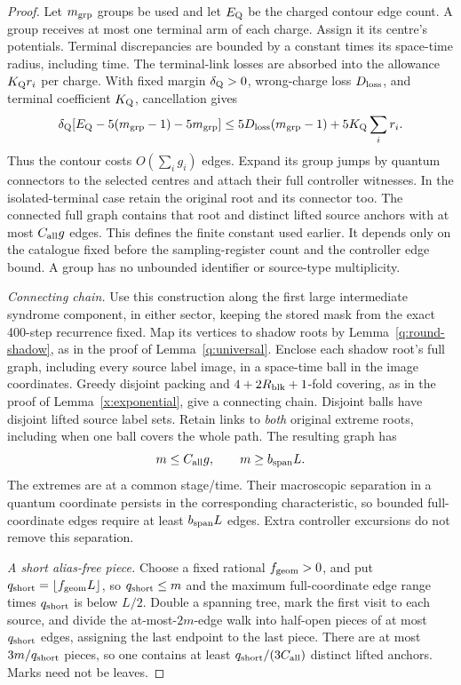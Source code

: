 \begin{proof}
Let \(m_{\rm grp}\) groups be used and let \(E_{\rm Q}\) be the
charged contour edge count. A group receives at most one terminal arm
of each charge. Assign it its centre's potentials. Terminal discrepancies
are bounded by a constant times its space-time radius, including time.
The terminal-link losses are absorbed into the allowance \(K_{\rm Q}r_i\) per charge.
With fixed margin \(\delta_{\rm Q}>0\), wrong-charge loss
\(D_{\rm loss}\), and terminal coefficient \(K_{\rm Q}\), cancellation
gives
\[
 \delta_{\rm Q}[E_{\rm Q}-5(m_{\rm grp}-1)-5m_{\rm grp}]
 \le5D_{\rm loss}(m_{\rm grp}-1)+5K_{\rm Q}\sum_i r_i.
\]
Thus the contour costs \(O(\sum_i g_i)\) edges. Expand its group jumps
by quantum connectors to the selected centres and attach their full
controller witnesses. In the isolated-terminal case retain the original
root and its connector too. The connected full graph contains that
root and distinct lifted source anchors with at most
\(C_{\rm all}g\) edges. This defines the finite constant used earlier.
It depends only on the catalogue fixed before the sampling-register count and the controller edge
bound. A group has no unbounded identifier or source-type multiplicity.

\emph{Connecting chain.} Use this construction along the first large intermediate syndrome
component, in either sector, keeping the stored mask from the exact
400-step recurrence fixed. Map its vertices to shadow roots by
Lemma~\ref{q:round-shadow}, as in the proof of
Lemma~\ref{q:universal}. Enclose each shadow root's full graph, including every source label image,
in a space-time ball in the image coordinates. Greedy disjoint packing
and \(4+2R_{\rm blk}+1\)-fold covering, as in the proof of Lemma~\ref{x:exponential},
give a connecting chain. Disjoint balls have disjoint lifted source label sets. Retain
links to \emph{both} original extreme roots, including when one ball
covers the whole path. The resulting graph has
\[
 m\le C_{\rm all}g,\qquad m\ge b_{\rm span}L.
\]
The extremes are at a common stage/time. Their macroscopic separation
in a quantum coordinate persists in the corresponding characteristic,
so bounded full-coordinate edges require at least \(b_{\rm span}L\)
edges. Extra controller excursions do not remove this separation.

\emph{A short alias-free piece.} Choose a fixed rational \(f_{\rm geom}>0\), and put
\(q_{\rm short}=\lfloor f_{\rm geom}L\rfloor\), so
\(q_{\rm short}\le m\) and the maximum full-coordinate edge range
times \(q_{\rm short}\) is below \(L/2\). Double a spanning tree,
mark the first visit to each source, and divide the at-most-\(2m\)-edge
walk into half-open pieces of at most \(q_{\rm short}\) edges, assigning
the last endpoint to the last piece. There are at most
\(3m/q_{\rm short}\) pieces, so one contains at least
\(q_{\rm short}/(3C_{\rm all})\) distinct lifted anchors. Marks need
not be leaves.


\end{proof}
